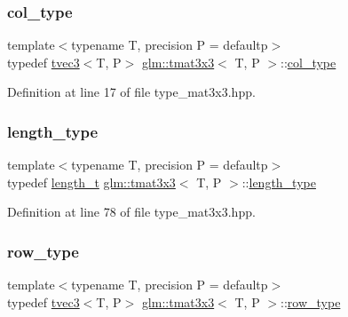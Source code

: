 \subsubsection{\texorpdfstring{col\_type}{col\_type}}
{\footnotesize\ttfamily template$<$typename T, precision P = defaultp$>$ \\
typedef \mbox{\hyperlink{structglm_1_1tvec3}{tvec3}}$<$T, P$>$ \mbox{\hyperlink{structglm_1_1tmat3x3}{glm\+::tmat3x3}}$<$ T, P $>$\+::\mbox{\hyperlink{structglm_1_1tmat3x3_a0b80bddb3cb4e01aa04d1c7a5a47365a}{col\+\_\+type}}}



Definition at line 17 of file type\+\_\+mat3x3.\+hpp.

\mbox{\label{structglm_1_1tmat3x3_a78fa6e6e406213fa0049b5125b2686b5}} 
\subsubsection{\texorpdfstring{length\_type}{length\_type}}
{\footnotesize\ttfamily template$<$typename T, precision P = defaultp$>$ \\
typedef \mbox{\hyperlink{namespaceglm_a090a0de2260835bee80e71a702492ed9}{length\+\_\+t}} \mbox{\hyperlink{structglm_1_1tmat3x3}{glm\+::tmat3x3}}$<$ T, P $>$\+::\mbox{\hyperlink{structglm_1_1tmat3x3_a78fa6e6e406213fa0049b5125b2686b5}{length\+\_\+type}}}



Definition at line 78 of file type\+\_\+mat3x3.\+hpp.

\mbox{\label{structglm_1_1tmat3x3_a98418fd5ee5f7d505a08b913086d8d25}} 
\subsubsection{\texorpdfstring{row\_type}{row\_type}}
{\footnotesize\ttfamily template$<$typename T, precision P = defaultp$>$ \\
typedef \mbox{\hyperlink{structglm_1_1tvec3}{tvec3}}$<$T, P$>$ \mbox{\hyperlink{structglm_1_1tmat3x3}{glm\+::tmat3x3}}$<$ T, P $>$\+::\mbox{\hyperlink{structglm_1_1tmat3x3_a98418fd5ee5f7d505a08b913086d8d25}{row\+\_\+type}}}




